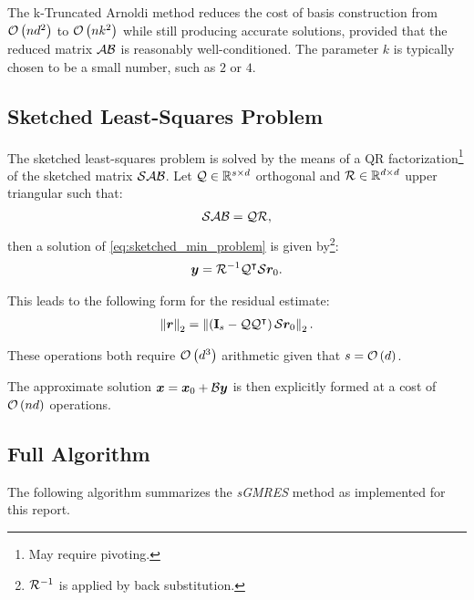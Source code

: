 The k-Truncated Arnoldi method reduces the cost of basis construction from $\mathcal{O} \left( n d^2 \right)$ to $\mathcal{O} \left( n k^2 \right)$ while still producing accurate solutions, provided that the reduced matrix $\mathcal{A} \mathcal{B}$ is reasonably well-conditioned. The parameter $k$ is typically chosen to be a small number, such as $2$ or $4$.

\newpage
\subsection{Sketched Least-Squares Problem} \label{sseq:least_squares}

The sketched least-squares problem is solved by the means of a QR factorization\footnote{May require pivoting.} of the sketched matrix $\mathcal{S} \mathcal{A} \mathcal{B}$. Let $\mathcal{Q} \in \mathbb{R}^{s \times d}$ orthogonal and $\mathcal{R} \in \mathbb{R}^{d \times d}$ upper triangular such that:
\begin{align}
    \mathcal{S} \mathcal{A} \mathcal{B} = \mathcal{Q} \mathcal{R},
\end{align}
then a solution of \cref{eq:sketched_min_problem} is given by\footnote{$\mathcal{R}^{-1}$ is applied by back substitution.}:
\begin{align}
    \bm{y} = \mathcal{R}^{-1} \mathcal{Q}^{\intercal} \mathcal{S} \bm{r}_0.
\end{align}

This leads to the following form for the residual estimate:
\begin{align}
    \left\lVert \bm{r} \right\rVert_2 = \left\lVert  \left( \mathbf{I}_s - \mathcal{Q} \mathcal{Q}^{\intercal} \right) \mathcal{S} \bm{r}_0  \right\rVert_2.
\end{align}

These operations both require $\mathcal{O} \left( d^3 \right)$ arithmetic given that $s = \mathcal{O} \left( d \right)$.

The approximate solution $\bm{x} = \bm{x}_0 + \mathcal{B} \bm{y}$ is then explicitly formed at a cost of $\mathcal{O} \left( n d \right)$ operations.

\subsection{Full Algorithm} \label{sseq:algorithm}

The following algorithm summarizes the \textit{sGMRES} method as implemented for this report.


